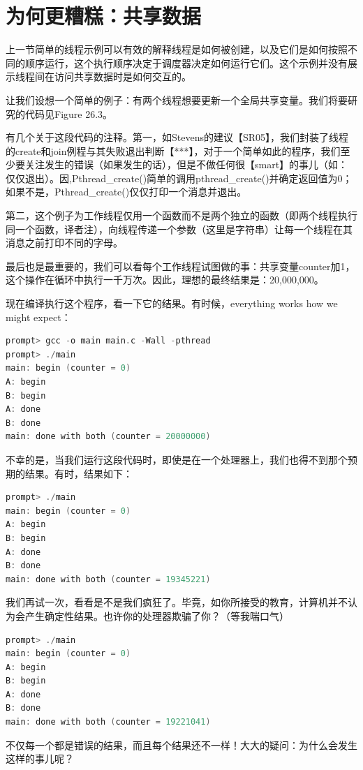 \section{为何更糟糕：共享数据}
上一节简单的线程示例可以有效的解释线程是如何被创建，以及它们是如何按照不同的顺序运行，这个执行顺序决定于调度器决定如何运行它们。这个示例并没有展示线程间在访问共享数据时是如何交互的。

让我们设想一个简单的例子：有两个线程想要更新一个全局共享变量。我们将要研究的代码见Figure 26.3。

有几个关于这段代码的注释。第一，如Stevens的建议【SR05】，我们封装了线程的create和join例程与其失败退出判断【***】，对于一个简单如此的程序，我们至少要关注发生的错误（如果发生的话），但是不做任何很【smart】的事儿（如：仅仅退出）。因,Pthread\_create()简单的调用pthread\_create()并确定返回值为0；如果不是，Pthread\_create()仅仅打印一个消息并退出。

第二，这个例子为工作线程仅用一个函数而不是两个独立的函数（即两个线程执行同一个函数，译者注），向线程传递一个参数（这里是字符串）让每一个线程在其消息之前打印不同的字母。

最后也是最重要的，我们可以看每个工作线程试图做的事：共享变量counter加1，这个操作在循环中执行一千万次。因此，理想的最终结果是：20,000,000。

现在编译执行这个程序，看一下它的结果。有时候，everything works how we might expect：
\begin{lstlisting}[language=C]
prompt> gcc -o main main.c -Wall -pthread
prompt> ./main
main: begin (counter = 0)
A: begin
B: begin
A: done
B: done
main: done with both (counter = 20000000)
\end{lstlisting}

不幸的是，当我们运行这段代码时，即使是在一个处理器上，我们也得不到那个预期的结果。有时，结果如下：
\begin{lstlisting}[language=C]
prompt> ./main
main: begin (counter = 0)
A: begin
B: begin
A: done
B: done
main: done with both (counter = 19345221)
\end{lstlisting}

我们再试一次，看看是不是我们疯狂了。毕竟，如你所接受的教育，计算机并不认为会产生确定性结果。也许你的处理器欺骗了你？（等我喘口气）
\begin{lstlisting}[language=C]
prompt> ./main
main: begin (counter = 0)
A: begin
B: begin
A: done
B: done
main: done with both (counter = 19221041)
\end{lstlisting}

不仅每一个都是错误的结果，而且每个结果还不一样！大大的疑问：为什么会发生这样的事儿呢？

